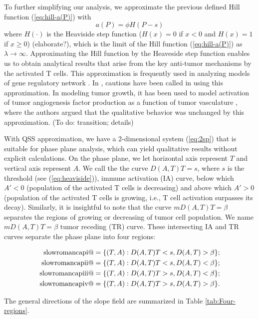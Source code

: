 \documentclass[review,authoryear]{elsarticle}
\makeatletter
\newcommand*{\rom}[1]{\expandafter\@slowromancap\romannumeral #1@}
\makeatother
\begin{document}
To further simplifying our analysis, we approximate the previous defined Hill function (\ref{eq:hill-a(P)}) with 
\begin{equation} \label{eq:heaviside}
a(P)=\phi H(P-s)
\end{equation}
where $H(\cdot)$ is the Heaviside step function ($H(x)=0$ if $x<0$
and $H(x)=1$ if $x\ge0$) (elaborate?), which is the limit of the Hill
function (\ref{eq:hill-a(P)}) as $\lambda\to\infty$. Approximating the Hill function by the Heaveside
step function enables us to obtain analytical results that arise from
the key anti-tumor mechanisms by the activated T cells. This approximation
is frequently used in analyzing models of gene regulatory network
 \citep[e.g.,][]{Glass1973,Mestl1995}. In \citet{Polynikis2009},
cautions have been called in using this approximation. In modeling
tumor growth, it has been used to model activation of tumor angiogenesis
factor production as a function of tumor vasculature \citep{Stamper2007},
where the authors argued that the qualitative behavior was unchanged
by this approximation. (To do: transition; details)

With QSS approximation, we have a 2-dimensional system (\ref{eq:2sp}) that is suitable
for phase plane analysis, which can yield qualitative results without explicit calculations. On the phase plane, we let horizontal axis
represent $T$ and vertical axis represent $A$. We call the the curve
$D(A,T)T=s$, where $s$ is the threshold (see (\ref{eq:heaviside})), immune activation (IA) curve, below which $A'<0$ (population
of the activated T cells is decreasing) and above which $A'>0$ (population
of the activated T cells is growing, i.e., T cell activation surpasses its decay).
Similarly, it is insightful to note that the curve $mD(A,T)T=\beta$
separates the regions of  growing or decreasing of tumor cell population. We name
$mD(A,T)T=\beta$ tumor receding (TR) curve. These intersecting IA and TR curves separate
the phase plane into four regions: 
\begin{linenomath*}
\begin{align*} 
\text{\rom{1}} &=  \{(T,A): D(A,T)T<s, D(A,T)>\beta \}; \\ 
\text{\rom{2}} &=  \{(T,A): D(A,T)T<s, D(A,T)<\beta \}; \\ 
\text{\rom{3}} &=  \{(T,A): D(A,T)T>s, D(A,T)<\beta \}; \\ 
\text{\rom{4}} &=  \{(T,A): D(A,T)T>s, D(A,T)>\beta \}. 
\end{align*}
\end{linenomath*}
The general directions of the slope field are summarized in Table \ref{tab:Four-regions}. 
\end{document}

